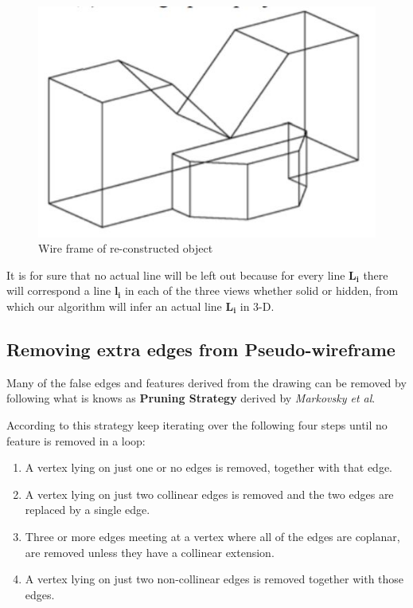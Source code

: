 \documentclass[a4paper,11pt,openany]{book}
\begin{document}
\begin{figure}[ht]
\centering
\includegraphics[scale=0.5]{WireframeModel}
\caption{Wire frame of re-constructed object}
\end{figure}

It is for sure that no actual line will be left out because for every line $\boldsymbol{L_i}$ there will correspond a line $\boldsymbol{l_i}$ in each of the three views whether solid or hidden, from which our algorithm will infer an actual line $\boldsymbol{L_i}$ in 3-D. 

\subsection{Removing extra edges from Pseudo-wireframe}
Many of the false edges and features derived from the drawing can be removed by following what is knows as \textbf{Pruning Strategy} derived by \textit{Markovsky et al}.

According to this strategy keep iterating over the following four steps until no feature is removed in a loop:
\begin{enumerate}
  \item A vertex lying on just one or no edges is removed, together with that edge.
  \item A vertex lying on just two collinear edges is removed and the two edges are replaced by a single edge.
  \item Three or more edges meeting at a vertex where all of the edges are coplanar, are removed unless they have a collinear extension.
  \item A vertex lying on just two non-collinear edges is removed together with those edges.
\end{enumerate}
\end{document}
